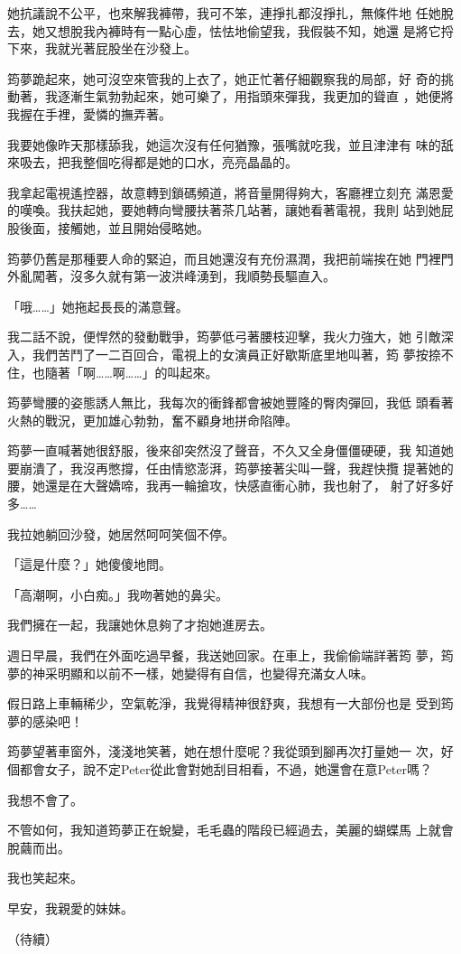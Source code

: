 她抗議說不公平，也來解我褲帶，我可不笨，連掙扎都沒掙扎，無條件地
任她脫去，她又想脫我內褲時有一點心虛，怯怯地偷望我，我假裝不知，她還
是將它捋下來，我就光著屁股坐在沙發上。

筠夢跪起來，她可沒空來管我的上衣了，她正忙著仔細觀察我的局部，好
奇的挑動著，我逐漸生氣勃勃起來，她可樂了，用指頭來彈我，我更加的聳直
，她便將我握在手裡，愛憐的撫弄著。

我要她像昨天那樣舔我，她這次沒有任何猶豫，張嘴就吃我，並且津津有
味的舐來吸去，把我整個吃得都是她的口水，亮亮晶晶的。

我拿起電視遙控器，故意轉到鎖碼頻道，將音量開得夠大，客廳裡立刻充
滿恩愛的嘆喚。我扶起她，要她轉向彎腰扶著茶几站著，讓她看著電視，我則
站到她屁股後面，接觸她，並且開始侵略她。

筠夢仍舊是那種要人命的緊迫，而且她還沒有充份濕潤，我把前端挨在她
門裡門外亂闖著，沒多久就有第一波洪峰湧到，我順勢長驅直入。

「哦……」她拖起長長的滿意聲。

我二話不說，便悍然的發動戰爭，筠夢低弓著腰枝迎擊，我火力強大，她
引敵深入，我們苦鬥了一二百回合，電視上的女演員正好歇斯底里地叫著，筠
夢按捺不住，也隨著「啊……啊……」的叫起來。

筠夢彎腰的姿態誘人無比，我每次的衝鋒都會被她豐隆的臀肉彈回，我低
頭看著火熱的戰況，更加雄心勃勃，奮不顧身地拼命陷陣。

筠夢一直喊著她很舒服，後來卻突然沒了聲音，不久又全身僵僵硬硬，我
知道她要崩潰了，我沒再憋撐，任由情慾澎湃，筠夢接著尖叫一聲，我趕快攬
提著她的腰，她還是在大聲嬌啼，我再一輪搶攻，快感直衝心肺，我也射了，
射了好多好多……

我拉她躺回沙發，她居然呵呵笑個不停。

「這是什麼？」她傻傻地問。

「高潮啊，小白痴。」我吻著她的鼻尖。

我們擁在一起，我讓她休息夠了才抱她進房去。

週日早晨，我們在外面吃過早餐，我送她回家。在車上，我偷偷端詳著筠
夢，筠夢的神采明顯和以前不一樣，她變得有自信，也變得充滿女人味。

假日路上車輛稀少，空氣乾淨，我覺得精神很舒爽，我想有一大部份也是
受到筠夢的感染吧！

筠夢望著車窗外，淺淺地笑著，她在想什麼呢？我從頭到腳再次打量她一
次，好個都會女子，說不定Peter從此會對她刮目相看，不過，她還會在意Peter嗎？

我想不會了。

不管如何，我知道筠夢正在蛻變，毛毛蟲的階段已經過去，美麗的蝴蝶馬
上就會脫繭而出。

我也笑起來。

早安，我親愛的妹妹。　


（待續）











